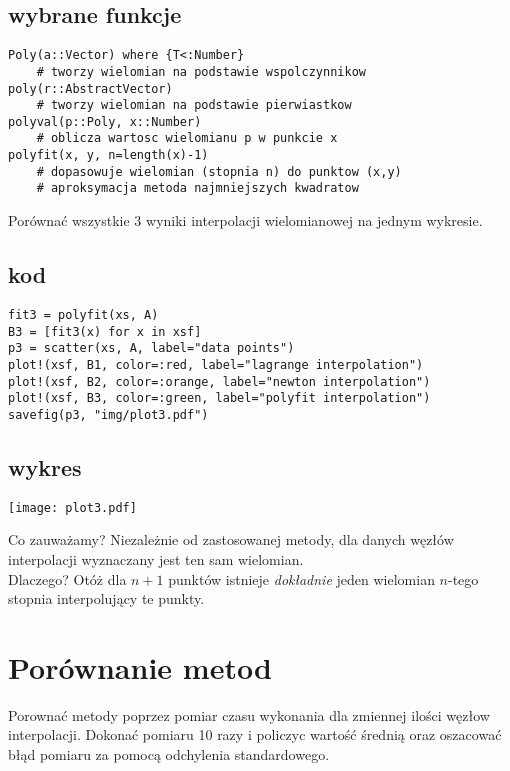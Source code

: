 \subsection{\bf wybrane funkcje}
\begin{lstlisting}
Poly(a::Vector) where {T<:Number} 
    # tworzy wielomian na podstawie wspolczynnikow
poly(r::AbstractVector) 
    # tworzy wielomian na podstawie pierwiastkow
polyval(p::Poly, x::Number)
    # oblicza wartosc wielomianu p w punkcie x
polyfit(x, y, n=length(x)-1)
    # dopasowuje wielomian (stopnia n) do punktow (x,y)
    # aproksymacja metoda najmniejszych kwadratow
\end{lstlisting}

\noindent Porównać wszystkie 3 wyniki interpolacji 
wielomianowej na jednym wykresie.
\subsection{\bf kod}
\begin{lstlisting}
fit3 = polyfit(xs, A)
B3 = [fit3(x) for x in xsf]
p3 = scatter(xs, A, label="data points")
plot!(xsf, B1, color=:red, label="lagrange interpolation")
plot!(xsf, B2, color=:orange, label="newton interpolation")
plot!(xsf, B3, color=:green, label="polyfit interpolation")
savefig(p3, "img/plot3.pdf")
\end{lstlisting}

\subsection{\bf wykres}
\begin{center}
    \texttt{[image: plot3.pdf]}
    \label{fig:3}
\end{center}

\noindent Co zauważamy? Niezależnie od zastosowanej metody, dla danych 
węzłów interpolacji wyznaczany jest ten sam wielomian. \\
Dlaczego? Otóż dla $n+1$ punktów istnieje \textit{dokładnie} jeden 
wielomian $n$-tego stopnia interpolujący te punkty.
\clearpage
\section{\bf Porównanie metod}
\noindent Porownać metody poprzez pomiar czasu wykonania dla zmiennej 
ilości węzłow interpolacji. Dokonać pomiaru 10 razy i policzyc wartość 
średnią oraz oszacować błąd pomiaru za pomocą odchylenia standardowego.
